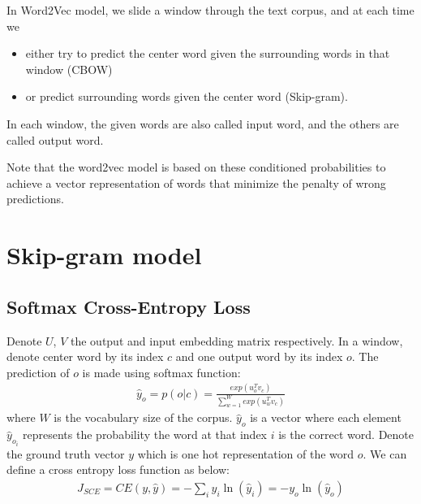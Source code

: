 \documentclass[12pt,oneside,a4paper]{book}
\theoremstyle{break}
\newcommand{\dictentry}[2]{%
  \newglossaryentry{#1}{name=#1,description={#2}}%
  \glslink{#1}{}%
}
\begin{document}









%
In Word2Vec model, we slide a window through the text corpus, and at each time we
\begin{itemize}
    \item either try to predict the center word given the surrounding words in that window (CBOW)
    \item or predict surrounding words given the center word (Skip-gram).
\end{itemize}
In each window, the given words are also called input word, and the others are called output word. 

Note that the word2vec model is based on these conditioned probabilities to achieve a vector representation of words that minimize the penalty of wrong predictions. 
\section{Skip-gram model}
\subsection{Softmax Cross-Entropy Loss}
Denote $U$, $V$ the output and input embedding matrix respectively. In a window, denote center word by its index $c$ and one output word by its index $o$. The prediction of $o$ is made using softmax function:
\begin{align}
\label{f1}
\hat{y}_o = p(o | c) = \frac{exp(u_o^T v_c)}{\sum_{w=1}^W exp(u_w^T v_c)} 
\end{align}
where $W$ is the vocabulary size of the corpus. $\hat{y}_o$ is a vector where each element $\hat{y}_{o_i}$ represents the probability the word at that index $i$ is the correct word. Denote the ground truth vector $y$ which is one hot representation of the word $o$. We can define a cross entropy loss function as below:
\begin{align}
J_{SCE} = CE(y, \hat{y}) = -\sum_i y_i \ln(\hat{y}_i) = - y_o \ln(\hat{y}_o)
\end{align}
\end{document}
